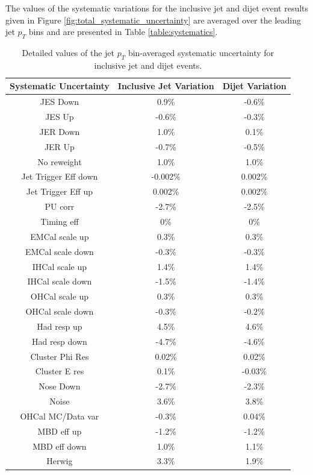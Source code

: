The values of the systematic variations for the inclusive jet and dijet event results given in Figure \ref{fig:total_systematic_uncertainty} are averaged over the leading jet $p_{T}$ bins and are presented in Table \ref{table:systematics}.
\begin{table}[ht]
\centering
\begin{tabular}{|c|c|c|}
\hline
Systematic Uncertainty & Inclusive Jet Variation & Dijet Variation \\ \hline
JES Down & 0.9\% & -0.6\% \\ \hline 
JES Up & -0.6\% & -0.3\% \\ \hline 
JER Down & 1.0\% & 0.1\% \\ \hline 
JER Up & -0.7\% & -0.5\% \\ \hline 
No reweight & 1.0\% & 1.0\% \\ \hline 
Jet Trigger Eff down & -0.002\% & 0.002\% \\ \hline 
Jet Trigger Eff up & 0.002\% & 0.002\% \\ \hline 
PU corr & -2.7\% & -2.5\% \\ \hline 
Timing eff & 0\% & 0\% \\ \hline 
EMCal scale up & 0.3\% & 0.3\% \\ \hline 
EMCal scale down & -0.3\% & -0.3\% \\ \hline 
IHCal scale up & 1.4\% & 1.4\% \\ \hline 
IHCal scale down & -1.5\% & -1.4\% \\ \hline 
OHCal scale up & 0.3\% & 0.3\% \\ \hline 
OHCal scale down & -0.3\% & -0.2\% \\ \hline 
Had resp up & 4.5\% & 4.6\% \\ \hline 
Had resp down & -4.7\% & -4.6\% \\ \hline 
Cluster Phi Res & 0.02\% & 0.02\% \\ \hline 
Cluster E res & 0.1\% & -0.03\% \\ \hline 
Nose Down & -2.7\% & -2.3\% \\ \hline
Noise & 3.6\% & 3.8\% \\ \hline 
OHCal MC/Data var & -0.3\% & 0.04\% \\ \hline 
MBD eff up & -1.2\% & -1.2\% \\ \hline 
MBD eff down & 1.0\% & 1.1\% \\ \hline 
Herwig & 3.3\% & 1.9\% \\ \hline
\end{tabular}
\caption{Detailed values of the jet $p_{T}$ bin-averaged systematic uncertainty for inclusive jet and dijet events.}
\end{table}
\label{table:systematics}
